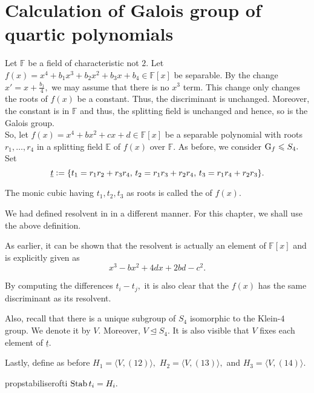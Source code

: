 \section{Calculation of Galois group of quartic polynomials}

Let $\mathbb{F}$ be a field of characteristic not $2.$ Let $f(x) = x^4 + b_1x^3 + b_2x^2 + b_3x + b_4 \in \mathbb{F}[x]$ be separable. By the change $x' = x + \frac{b_1}{4},$ we may assume that there is no $x^3$ term. This change only changes the roots of $f(x)$ be a constant. Thus, the discriminant is unchanged. Moreover, the constant is in $\mathbb{F}$ and thus, the splitting field is unchanged and hence, so is the Galois group. \\
So, let $f(x) = x^4 + bx^2 + cx + d \in \mathbb{F}[x]$ be a separable polynomial with roots $r_1, \ldots, r_4$ in a splitting field $\mathbb{E}$ of $f(x)$ over $\mathbb{F}.$ As before, we consider $\operatorname{G}_f \leqslant S_4.$ Set
\begin{equation*} 
	\underline{t} \vcentcolon= \{t_1 = r_1r_2 + r_3r_4,\, t_2 = r_1r_3 + r_2r_4,\, t_3 = r_1r_4 + r_2r_3\}.
\end{equation*}

\begin{defn}
	The monic cubic having $t_1, t_2, t_3$ as roots is called the  of $f(x).$
\end{defn}
\begin{rem}
	We had defined resolvent in  in a different manner. For this chapter, we shall use the above definition. 

	As earlier, it can be shown that the resolvent is actually an element of $\mathbb{F}[x]$ and is explicitly given as
	\begin{equation*} 
		x^3 - bx^2 + 4dx + 2bd - c^2.
	\end{equation*}

	By computing the differences $t_i - t_j,$ it is also clear that the $f(x)$ has the same discriminant as its resolvent.
\end{rem}

Also, recall that there is a unique subgroup of $S_4$ isomorphic to the Klein-$4$ group. We denote it by $V.$ Moreover, $V \unlhd S_4.$ It is also visible that $V$ fixes each element of $\underline{t}.$

Lastly, define as before $H_1 = \langle V, (12)\rangle,$ $H_2 = \langle V, (13)\rangle,$ and $H_3 = \langle V, (14)\rangle.$

\begin{restatable}[]{prop}{stabiliserofti}
\label{prop:stabiliserofti}
	$\operatorname{Stab} t_i = H_i.$ \hfill\hyperref[prop:stabiliserofti2]{\downsym}
\end{restatable}

